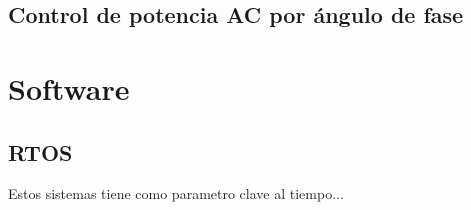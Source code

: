 \begin{comment}
The integration of Bluetooth, Bluetooth LE and Wi-Fi ensures that a wide range of applications can be targeted, and that the module is future proof: using Wi-Fi allows a large physical range and direct connection to the internet through a Wi-Fi router, while using Bluetooth allows the user to conveniently connect to the phone or broadcast low energy beacons for its detection. The sleep current of the ESP32 chip is less than 5

A, making it suitable for battery powered and wearable electronics applications. ESP32 supports a data rate of up to 150 Mbps, and 20.5 dBm output power at the antenna to ensure the widest physical range. As such the chip does offer industry-leading specifications and the best performance for electronic integration, range, power consumption, and connectivity.

The operating system chosen for ESP32 is freeRTOS with LwIP; TLS 1.2 with hardware acceleration is built in as well. Secure (encrypted) over the air (OTA) upgrade is also supported, so that developers can continually upgrade their products even after their release.
\end{comment}

\subsection{Control de potencia AC por ángulo de fase}


\section{Software}

\subsection{RTOS}

\cite{SO} Estos sistemas tiene como parametro clave al tiempo...

